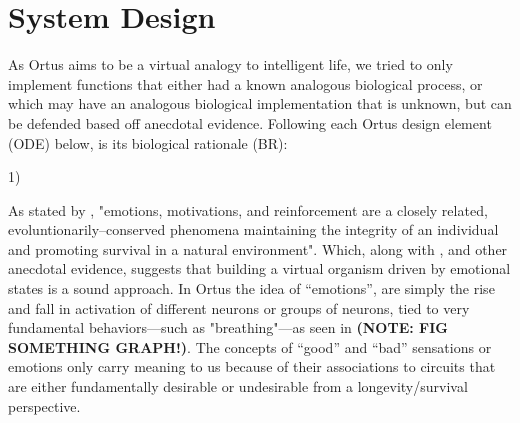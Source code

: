 \documentclass[letterpaper]{article}
\begin{document}
\section{System Design}


As Ortus aims to be a virtual analogy to intelligent life, we tried to only implement functions that either had a known analogous biological process, or which may have an analogous biological implementation that is unknown, but can be defended based off anecdotal evidence. Following each Ortus design element (ODE) below, is its biological rationale (BR):





1)

As stated by \cite{Verma2015}, "emotions, motivations, and reinforcement are a closely related, evoluntionarily--conserved phenomena maintaining the integrity of an individual and promoting survival in a natural environment". Which, along with \cite{Gore2015}, and other anecdotal evidence, suggests that building a virtual organism driven by emotional states is a sound approach. In Ortus the idea of ``emotions'', are simply the rise and fall in activation of different neurons or groups of neurons, tied to very fundamental behaviors---such as "breathing"---as seen in \textbf{(NOTE: FIG SOMETHING GRAPH!)}. The concepts of ``good'' and ``bad'' sensations or emotions only carry meaning to us because of their associations to circuits that are either fundamentally desirable or undesirable from a longevity/survival perspective.
\end{document}

